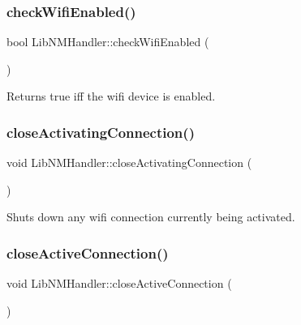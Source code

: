 \subsubsection{\texorpdfstring{check\+Wifi\+Enabled()}{checkWifiEnabled()}}
{\footnotesize\ttfamily bool Lib\+N\+M\+Handler\+::check\+Wifi\+Enabled (\begin{DoxyParamCaption}{ }\end{DoxyParamCaption})\hspace{0.3cm}{\ttfamily [protected]}}

\begin{DoxyReturn}{Returns}
true iff the wifi device is enabled. 
\end{DoxyReturn}
\mbox{\label{classLibNMHandler_a7aae3af6ef86da365f629faf37234f98}} 
\subsubsection{\texorpdfstring{close\+Activating\+Connection()}{closeActivatingConnection()}}
{\footnotesize\ttfamily void Lib\+N\+M\+Handler\+::close\+Activating\+Connection (\begin{DoxyParamCaption}{ }\end{DoxyParamCaption})\hspace{0.3cm}{\ttfamily [protected]}}

Shuts down any wifi connection currently being activated. \mbox{\label{classLibNMHandler_aabadb14cb6628ff27bfa6d26960cde27}} 
\subsubsection{\texorpdfstring{close\+Active\+Connection()}{closeActiveConnection()}}
{\footnotesize\ttfamily void Lib\+N\+M\+Handler\+::close\+Active\+Connection (\begin{DoxyParamCaption}{ }\end{DoxyParamCaption})\hspace{0.3cm}{\ttfamily [protected]}}


